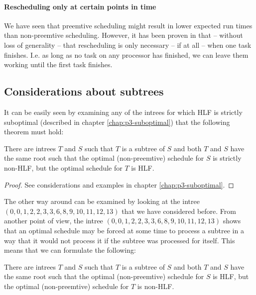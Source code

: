 \paragraph{Rescheduling only at certain points in time}

We have seen that preemtive scheduling might result in lower expected run times than non-preemtive scheduling. However, it has been proven in \cite{chandyreynoldslargepaper1979} that -- without loss of generality -- that rescheduling is only necessary -- if at all -- when one task finishes. I.e. as long as no task on any processor has finished, we can leave them working until the first task finishes.

\subsection{Considerations about subtrees}
\label{sec:properties-optimal-schedules-no-implications}

It can be easily seen by examining any of the intrees for which HLF is strictly suboptimal (described in chapter \ref{chap:p3-suboptimal}) that the following theorem must hold:

\begin{theorem}
  There are intrees $T$ and $S$ such that $T$ is a subtree of $S$ and both $T$ and $S$ have the same root such that the optimal (non-preemtive) schedule for $S$ is strictly non-HLF, but the optimal schedule for $T$ is HLF.
\end{theorem}

\begin{proof}
  See considerations and examples in chapter \ref{chap:p3-suboptimal}.
\end{proof}

The other way around can be examined by looking at the intree $(0,0,1,2,2,3,3,6,8,9,10,11,12,13)$ that we have considered before. From another point of view, the intree $(0,0,1,2,2,3,3,6,8,9,10,11,12,13)$ shows that an optimal schedule may be forced at some time to process a subtree in a way that it would not process it if the subtree was processed for itself. This means that we can formulate the following:

\begin{theorem}
  There are intrees $T$ and $S$ such that $T$ is a subtree of $S$ and both $T$ and $S$ have the same root such that the optimal (non-preemtive) schedule for $S$ is HLF, but the optimal (non-preemtive) schedule for $T$ is non-HLF.
\end{theorem}

